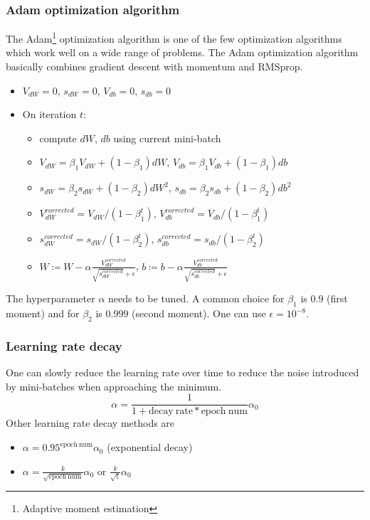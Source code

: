 \documentclass{article}
\begin{document}
\subsubsection{Adam optimization algorithm}
The Adam\footnote{Adaptive moment estimation} optimization algorithm is one of the few optimization algorithms
which work well on a wide range of problems.
The Adam optimization algorithm basically combines gradient descent with momentum and RMSprop.
\begin{itemize}
  \item $V_{dW}=0$, $s_{dW}=0$, $V_{db}=0$, $s_{db}=0$
  \item On iteration $t$:
    \begin{itemize}
      \item compute $dW$, $db$ using current mini-batch
      \item $V_{dW}=\beta_1 V_{dW}+(1-\beta_1)dW$, $V_{db}=\beta_1 V_{db}+(1-\beta_1)db$
      \item $s_{dW}=\beta_2 s_{dW}+(1-\beta_2)dW^2$, $s_{db}=\beta_2 s_{db}+(1-\beta_2)db^2$
      \item $V_{dW}^{corrected}=V_{dW}/(1-\beta_1^t)$, $V_{db}^{corrected}=V_{db}/(1-\beta_1^t)$
      \item $s_{dW}^{corrected}=s_{dW}/(1-\beta_2^t)$, $s_{db}^{corrected}=s_{db}/(1-\beta_2^t)$
      \item $W\coloneqq W-\alpha\frac{V_{dW}^{corrected}}{\sqrt{s_{dW}^{corrected}}+\epsilon}$,
        $b\coloneqq b-\alpha\frac{V_{db}^{corrected}}{\sqrt{s_{db}^{corrected}}+\epsilon}$
    \end{itemize}
\end{itemize}
The hyperparameter $\alpha$ needs to be tuned.
A common choice for $\beta_1$ is $0.9$ (first moment) and for $\beta_2$ is $0.999$ (second moment).
One can use $\epsilon=10^{-8}$.

\subsubsection{Learning rate decay}
One can slowly reduce the learning rate over time to reduce the noise introduced by mini-batches
when approaching the minimum.
\begin{equation}
  \alpha=\frac{1}{1+\mathrm{decay\ rate}*\mathrm{epoch\ num}}\alpha_0
\end{equation}
Other learning rate decay methods are
\begin{itemize}
  \item $\alpha=0.95^{\mathrm{epoch\ num}}\alpha_0$ (exponential decay)
  \item $\alpha=\frac{k}{\sqrt{\mathrm{epoch\ num}}}\alpha_0$ or $\frac{k}{\sqrt{t}}\alpha_0$
\end{itemize}
\end{document}

